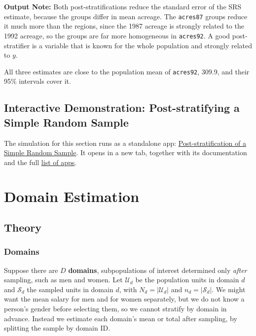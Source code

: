 \documentclass[
  letterpaper,
  DIV=11,
  numbers=noendperiod]{scrreprt}
\renewcommand{\[}{\begin{equation}}
\renewcommand{\]}{\end{equation}}
\begin{document}
\textbf{Output Note:} Both post-stratifications reduce the standard
error of the SRS estimate, because the groups differ in mean acreage.
The \texttt{acres87} groups reduce it much more than the regions, since
the 1987 acreage is strongly related to the 1992 acreage, so the groups
are far more homogeneous in \texttt{acres92}. A good post-stratifier is
a variable that is known for the whole population and strongly related
to \(y\).

All three estimates are close to the population mean of
\texttt{acres92}, 309.9, and their 95\% intervals cover it.

\subsection{Interactive Demonstration: Post-stratifying a Simple Random
Sample}\label{sec-poststrat-app}

The simulation for this section runs as a standalone app:
\href{../shinylives_sampling/app-poststrat.html}{Post-stratification of
a Simple Random Sample}. It opens in a new tab, together with its
documentation and the full \href{../shinylives_sampling/index.html}{list
of apps}.

\section{Domain Estimation}\label{domain-estimation}

\subsection{Theory}\label{sec-domain-theory}

\subsubsection{Domains}\label{domains}

Suppose there are \(D\) \textbf{domains}, subpopulations of interest
determined only \emph{after} sampling, such as men and women. Let
\(\mathcal U_d\) be the population units in domain \(d\) and
\(\mathcal S_d\) the sampled units in domain \(d\), with
\(N_d = |\mathcal U_d|\) and \(n_d = |\mathcal S_d|\). We might want the
mean salary for men and for women separately, but we do not know a
person's gender before selecting them, so we cannot stratify by domain
in advance. Instead we estimate each domain's mean or total after
sampling, by splitting the sample by domain ID.
\end{document}
